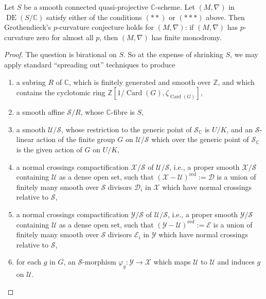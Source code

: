 Let \(S\) be a smooth connected quasi-projective \(\mathbb{C}\)-scheme. Let \((M,\nabla)\) in \(\operatorname{DE}(S/\mathbb{C})\) satisfy either of the conditions \((**)\) or \((***)\) above. Then Grothendieck's \(p\)-curvature conjecture holds for \((M,\nabla)\): if \((M,\nabla)\) has \(p\)-curvature zero for almost all \(p\), then \((M,\nabla)\) has finite monodromy.
\begin{proof}
The question is birational on \(S\). So at the expense of shrinking \(S\), we may apply standard ``spreading out'' techniques to produce
\begin{enumerate}[label=(\arabic*)]
\item a subring \(R\) of \(\mathbb{C}\), which is finitely generated and smooth over \(\mathbb{Z}\), and which contains the cyclotomic ring \(\mathbb{Z}[1/\operatorname{Card}(G),\zeta_{\operatorname{Card}(G)}]\),
\item a smooth affine \(\mathcal{S}/R\), whose \(\mathbb{C}\)-fibre is \(S\),
\item a smooth \(\mathcal{U}/\mathcal{S}\), whose restriction to the generic point of \(\mathcal{S}_{\mathbb{C}}\) is \(U/K\), and an \(\mathcal{S}\)-linear action of the finite group \(G\) on \(\mathcal{U}/\mathcal{S}\) which over the generic point of \(\mathcal{S}_{\mathbb{C}}\) is the given action of \(G\) on \(U/K\),
\item a normal crossings compactification \(\mathcal{X}/\mathcal{S}\) of \(\mathcal{U}/\mathcal{S}\), i.e., a proper smooth \(\mathcal{X}/\mathcal{S}\) containing \(\mathcal{U}\) as a dense open set, such that \((\mathcal{X}-\mathcal{U})^{\mathrm{red}}:=\mathcal{D}\) is a union of finitely many smooth over \(\mathcal{S}\) divisors \(\mathcal{D}_i\) in \(\mathcal{X}\) which have normal crossings relative to \(\mathcal{S}\),
\item a normal crossings compactification \(\mathcal{Y}/\mathcal{S}\) of \(\mathcal{U}/\mathcal{S}\), i.e., a proper smooth \(\mathcal{Y}/\mathcal{S}\) containing \(\mathcal{U}\) as a dense open set, such that \((\mathcal{Y}-\mathcal{U})^{\mathrm{red}}:=\mathcal{E}\) is a union of finitely many smooth over \(\mathcal{S}\) divisors \(\mathcal{E}_i\) in \(\mathcal{Y}\) which have normal crossings relative to \(\mathcal{S}\),
\item for each \(g\) in \(G\), an \(\mathcal{S}\)-morphism \(\varphi_g:\mathcal{Y}\to\mathcal{X}\) which maps \(\mathcal{U}\) to \(\mathcal{U}\) and induces \(g\) on \(\mathcal{U}\).
\end{enumerate}


\end{proof}
